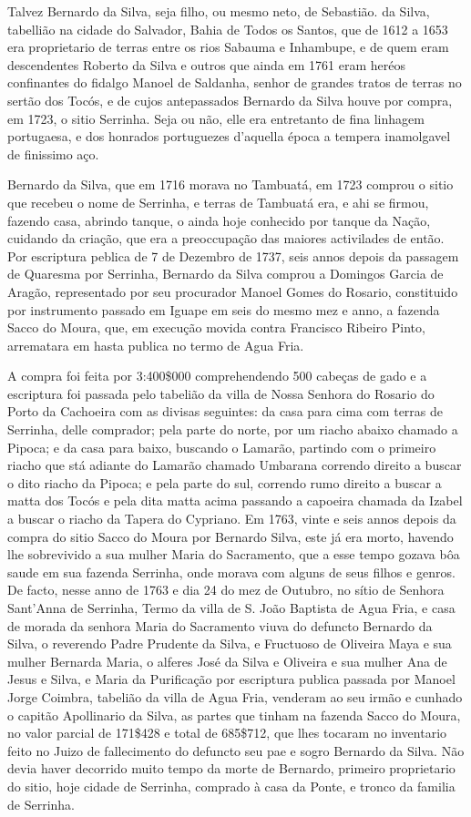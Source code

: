 Talvez Bernardo da Silva, seja filho, ou mesmo neto, de Sebastião. da Silva, tabellião na cidade do Salvador, Bahia de Todos os Santos, que de 1612 a 1653 era proprietario de terras entre os rios Sabauma e Inhambupe, e de quem eram descendentes Roberto da Silva e outros que ainda em 1761 eram heréos confinantes do fidalgo Manoel de Saldanha, senhor de grandes tratos de terras no sertão dos Tocós, e de cujos antepassados Bernardo da Silva houve por compra, em 1723, o sitio Serrinha. Seja ou não, elle era entretanto de fina linhagem portugaesa, e dos honrados portuguezes d'aquella época a tempera inamolgavel de finissimo aço.

Bernardo da Silva, que em 1716 morava no Tambuatá, em 1723 comprou o sitio que recebeu o nome de Serrinha, e terras de Tambuatá era, e ahi se firmou, fazendo casa, abrindo tanque, o ainda hoje conhecido por tanque da Nação, cuidando da criação, que era a preoccupação das maiores activilades de então. Por escriptura peblica de 7 de Dezembro de 1737, seis annos depois da passagem de Quaresma por Serrinha, Bernardo da Silva comprou a Domingos Garcia de Aragão, representado por seu procurador Manoel Gomes do Rosario, constituido por instrumento passado em Iguape em seis do mesmo mez e anno, a fazenda Sacco do Moura, que, em execução movida contra Francisco Ribeiro Pinto, arrematara em hasta publica no termo de Agua Fria.

A compra foi feita por 3:400\$000 comprehendendo 500 cabeças de gado e a escriptura foi passada pelo tabelião da villa de Nossa Senhora do Rosario do Porto da Cachoeira com as divisas seguintes: da casa para cima com terras de Serrinha, delle comprador; pela parte do norte, por um riacho abaixo chamado a Pipoca; e da casa para baixo, buscando o Lamarão, partindo com o primeiro riacho que stá adiante do Lamarão chamado Umbarana correndo direito a buscar o dito riacho da Pipoca; e pela parte do sul, correndo rumo direito a buscar a matta dos Tocós e pela dita matta acima passando a capoeira chamada da Izabel a buscar o riacho da Tapera do Cypriano. Em 1763, vinte e seis annos depois da compra do sitio Sacco do Moura por Bernardo Silva, este já era morto, havendo lhe sobrevivido a sua mulher Maria do Sacramento, que a esse tempo gozava bôa saude em sua fazenda Serrinha, onde morava com alguns de seus filhos e genros. De facto, nesse anno de 1763 e dia 24 do mez de Outubro, no sítio de Senhora Sant'Anna de Serrinha, Termo da villa de S. João Baptista de Agua Fria, e casa de morada da senhora Maria do Sacramento viuva do defuncto Bernardo da Silva, o reverendo Padre Prudente da Silva, e Fructuoso de Oliveira Maya e sua mulher Bernarda Maria, o alferes José da Silva e Oliveira e sua mulher Ana de Jesus e Silva, e Maria da Purificação por escriptura publica passada por Manoel Jorge Coimbra, tabelião da villa de Agua Fria, venderam ao seu irmão e cunhado o capitão Apollinario da Silva, as partes que tinham na fazenda Sacco do Moura, no valor parcial de  171\$428 e  total de 685\$712, que lhes  tocaram no inventario feito no Juizo de fallecimento do defuncto seu pae e sogro Bernardo da Silva. Não devia haver decorrido muito tempo da morte de Bernardo, primeiro proprietario do sitio, hoje cidade de Serrinha, comprado à casa da Ponte, e tronco da familia de Serrinha.

